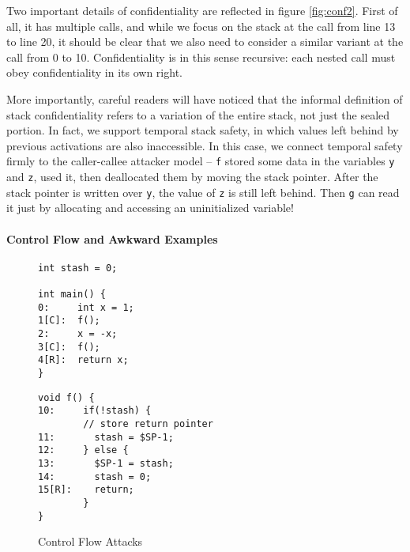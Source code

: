 \documentclass[acmsmall,review,anonymous]{acmart}\settopmatter{printfolios=true,printccs=false,printacmref=false}
\begin{document}
Two important details of confidentiality are reflected in figure \ref{fig:conf2}.
First of all, it has multiple calls, and while we focus on the stack at the call
from line 13 to line 20, it should be clear that we also need to consider a similar
variant at the call from 0 to 10. Confidentiality is in this sense recursive: each
nested call must obey confidentiality in its own right.

More importantly, careful readers will have noticed that the informal definition
of stack confidentiality refers to a variation of the entire stack, not just the
sealed portion. In fact, we support temporal stack safety, in which values left behind
by previous activations are also inaccessible. In this case, we connect temporal safety
firmly to the caller-callee attacker model -- {\tt f} stored some data in the variables
{\tt y} and {\tt z}, used it, then deallocated them by moving the stack pointer.
After the stack pointer is written over {\tt y}, the value of {\tt z} is still
left behind. Then {\tt g} can read it just by allocating and accessing an uninitialized
variable!

\paragraph*{Control Flow and Awkward Examples}

\begin{figure}
  \centering
  \begin{minipage}{.4\textwidth}
\begin{verbatim}
int stash = 0;

int main() {
0:     int x = 1;
1[C]:  f();
2:     x = -x;
3[C]:  f();
4[R]:  return x;
}
\end{verbatim}
  \end{minipage}
  \begin{minipage}{.4\textwidth}
\begin{verbatim}
void f() {
10:     if(!stash) {
        // store return pointer
11:       stash = $SP-1;
12:     } else {
13:       $SP-1 = stash;
14:       stash = 0;
15[R]:    return;
        }
}
\end{verbatim}
  \end{minipage}
\label{fig:WBCF1}
%
%
  \caption{Control Flow Attacks}
  \label{fig:WBCF}
\end{figure}
\end{document}
